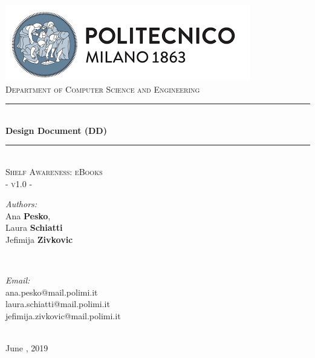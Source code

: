 \documentclass[a4paper, hidelinks, 12pt]{report}
\begin{document}
	\begin{titlepage}
		\centering
		\vspace*{0.7 cm}
		\includegraphics[scale = 0.85]{polimilogo.png}\\[1.6 cm]
		\textsc{\large Department of Computer Science and Engineering}\\[1.8 cm]
		
		\rule{\linewidth}{0.2 mm} \\[0.4 cm]
		{ \huge \bfseries Design Document (DD)}\\
		\rule{\linewidth}{0.2 mm} \\[1.5 cm]
		
		\textsc{\Large Shelf Awareness: eBooks}\\[0.5 cm]
		\textsc{\large - v1.0 -}\\[1 cm]
		
		\begin{minipage}{0.5\textwidth}
			\begin{flushleft} \large
				\emph{Authors:}\\
				Ana \textbf{Pesko},  \\
				Laura \textbf{Schiatti} \\
				Jefimija \textbf{Zivkovic}
			\end{flushleft}
		\end{minipage}~
		\begin{minipage}{0.5\textwidth}
			\begin{flushright} \large
				\emph{Email:} \\
				ana.pesko@mail.polimi.it\\
				laura.schiatti@mail.polimi.it\\
				jefimija.zivkovic@mail.polimi.it
			\end{flushright}
		\end{minipage}\\[2 cm]
		
		{\large June  , 2019}\\[2 cm]
		
		\vfill
	\end{titlepage}
	
	\tableofcontents
	\listoffigures
\end{document}
